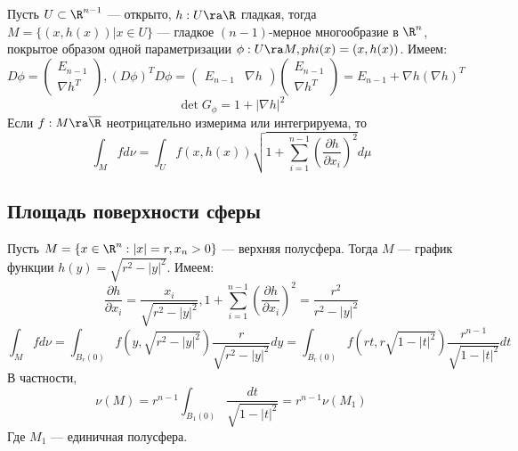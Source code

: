 \begin{example}
    Пусть \(U \subset \R^{n - 1}\) --- открыто, \(h: U \ra \R\) гладкая, тогда \(M = \{(x, h(x)) | x \in U\}\) --- гладкое \((n - 1)\)-мерное многообразие в \(\R^n\), покрытое образом одной параметризации \(\phi: U \ra M, phi(x) = (x, h(x))\). Имеем:
    \[D\phi = \left( \begin{array}{c}
        E_{n - 1} \\
        \nabla h^T
    \end{array} \right), (D\phi)^TD\phi = \left( \begin{array}{cc}
        E_{n - 1} & \nabla h
    \end{array} \right)\left( \begin{array}{c}
        E_{n - 1} \\
        \nabla h^T
    \end{array} \right) = E_{n - 1} + \nabla h(\nabla h)^T\]
    \[\det G_\phi = 1 + |\nabla h|^2\]
    Если \(f: M \ra \overline{\R}\) неотрицательно измерима или интегрируема, то
    \[\int_M f d \nu = \int_U f(x, h(x))\sqrt{1 + \sum_{i = 1}^{n - 1}\left( \frac{\partial h}{\partial x_i} \right)^2}d\mu\]
\end{example}

\subsection{Площадь поверхности сферы}
\begin{example}
    Пусть \(M = \{x \in \R^n: |x| = r, x_n > 0\}\) --- верхняя полусфера. Тогда \(M\) --- график функции \(h(y) = \sqrt{r^2 - |y|^2}\). Имеем:
    \[\frac{\partial h}{\partial x_i} = \frac{x_i}{\sqrt{r^2 - |y|^2}}, 1 + \sum_{i = 1}^{n - 1}\left( \frac{\partial h}{\partial x_i} \right)^2 = \frac{r^2}{r^2 - |y|^2}\]
    \[\int_M f d\nu = \int_{B_r(0)}f(y, \sqrt{r^2 - |y|^2})\frac{r}{\sqrt{r^2 - |y|^2}}dy = \int_{B_r(0)}f(rt, r\sqrt{1 - |t|^2})\frac{r^{n - 1}}{\sqrt{1 - |t|^2}}dt\] 
    В частности,
    \[\nu(M) = r^{n - 1}\int_{B_1(0)}\frac{dt}{\sqrt{1 - |t|^2}} = r^{n - 1}\nu(M_1)\]
    Где \(M_1\) --- единичная полусфера.
\end{example}

